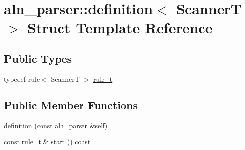 \hypertarget{structaln__parser_1_1definition}{\section{aln\+\_\+parser\+:\+:definition$<$ Scanner\+T $>$ Struct Template Reference}
\label{structaln__parser_1_1definition}
}
\subsection*{Public Types}
\begin{DoxyCompactItemize}
\item 
typedef rule$<$ Scanner\+T $>$ \hyperlink{structaln__parser_1_1definition_a03794636bf4d0d047278756431378b21}{rule\+\_\+t}
\end{DoxyCompactItemize}
\subsection*{Public Member Functions}
\begin{DoxyCompactItemize}
\item 
\hyperlink{structaln__parser_1_1definition_a42905d4ad1a5da3e34297857fadc7b82}{definition} (const \hyperlink{structaln__parser}{aln\+\_\+parser} \&self)
\item 
const \hyperlink{structaln__parser_1_1definition_a03794636bf4d0d047278756431378b21}{rule\+\_\+t} \& \hyperlink{structaln__parser_1_1definition_a517bf426283fea0e277925844444795b}{start} () const 
\end{DoxyCompactItemize}
